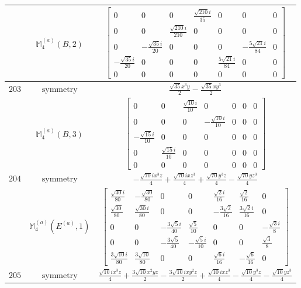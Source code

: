 \documentclass[fleqn,8pt,landscape]{jsarticle}
\begin{document}
\begin{longtable}{ccc}
$  $ & $ \mathbb{M}_{4}^{(a)}(B,2) $ & $ \begin{bmatrix} 0 & 0 & 0 & \frac{\sqrt{210} i}{35} & 0 & 0 & 0 \\ 0 & 0 & \frac{\sqrt{210} i}{210} & 0 & 0 & 0 & 0 \\ 0 & - \frac{\sqrt{35} i}{20} & 0 & 0 & 0 & - \frac{5 \sqrt{21} i}{84} & 0 \\ - \frac{\sqrt{35} i}{20} & 0 & 0 & 0 & \frac{5 \sqrt{21} i}{84} & 0 & 0 \\ 0 & 0 & 0 & 0 & 0 & 0 & 0 \end{bmatrix} $ \\ \hline
$ 203 $ & $ \text{symmetry} $ & $ \frac{\sqrt{35} x^{3} y}{2} - \frac{\sqrt{35} x y^{3}}{2} $ \\
$  $ & $ \mathbb{M}_{4}^{(a)}(B,3) $ & $ \begin{bmatrix} 0 & 0 & \frac{\sqrt{10} i}{10} & 0 & 0 & 0 & 0 \\ 0 & 0 & 0 & - \frac{\sqrt{10} i}{10} & 0 & 0 & 0 \\ - \frac{\sqrt{15} i}{10} & 0 & 0 & 0 & 0 & 0 & 0 \\ 0 & \frac{\sqrt{15} i}{10} & 0 & 0 & 0 & 0 & 0 \\ 0 & 0 & 0 & 0 & 0 & 0 & 0 \end{bmatrix} $ \\ \hline
$ 204 $ & $ \text{symmetry} $ & $ - \frac{\sqrt{70} i x^{3} z}{4} + \frac{\sqrt{70} i x z^{3}}{4} + \frac{\sqrt{70} y^{3} z}{4} - \frac{\sqrt{70} y z^{3}}{4} $ \\
$  $ & $ \mathbb{M}_{4}^{(a)}(E^{(a)},1) $ & $ \begin{bmatrix} \frac{\sqrt{30} i}{80} & - \frac{\sqrt{30}}{80} & 0 & 0 & \frac{\sqrt{2} i}{16} & \frac{\sqrt{2}}{16} & 0 \\ \frac{\sqrt{30}}{80} & \frac{\sqrt{30} i}{80} & 0 & 0 & - \frac{3 \sqrt{2}}{16} & \frac{3 \sqrt{2} i}{16} & 0 \\ 0 & 0 & - \frac{3 \sqrt{5} i}{40} & \frac{\sqrt{5}}{10} & 0 & 0 & - \frac{\sqrt{3} i}{8} \\ 0 & 0 & - \frac{3 \sqrt{5}}{40} & - \frac{\sqrt{5} i}{10} & 0 & 0 & \frac{\sqrt{3}}{8} \\ \frac{3 \sqrt{10} i}{80} & \frac{3 \sqrt{10}}{80} & 0 & 0 & \frac{\sqrt{6} i}{16} & - \frac{\sqrt{6}}{16} & 0 \end{bmatrix} $ \\ \hline
$ 205 $ & $ \text{symmetry} $ & $ \frac{\sqrt{10} i x^{3} z}{4} + \frac{3 \sqrt{10} x^{2} y z}{2} - \frac{3 \sqrt{10} i x y^{2} z}{2} + \frac{\sqrt{10} i x z^{3}}{4} - \frac{\sqrt{10} y^{3} z}{4} - \frac{\sqrt{10} y z^{3}}{4} $ \\

\end{longtable}
\end{document}
